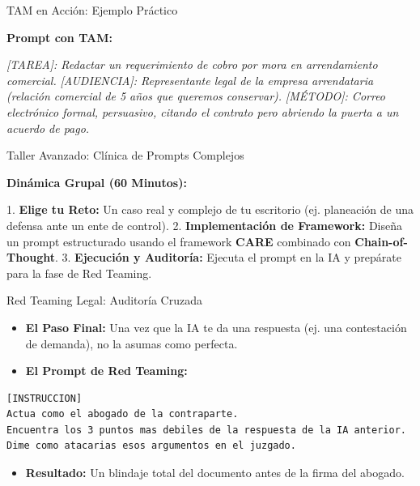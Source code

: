 \documentclass[aspectratio=169]{beamer}
\begin{document}
\begin{frame}[fragile]{TAM en Acción: Ejemplo Práctico}


\textbf{Prompt con TAM:}

\textit{[TAREA]: Redactar un requerimiento de cobro por mora en arrendamiento comercial.}
\textit{[AUDIENCIA]: Representante legal de la empresa arrendataria (relación comercial de 5 años que queremos conservar).}
\textit{[MÉTODO]: Correo electrónico formal, persuasivo, citando el contrato pero abriendo la puerta a un acuerdo de pago.}

\end{frame}



\begin{frame}[fragile]{Taller Avanzado: Clínica de Prompts Complejos}


\textbf{Dinámica Grupal (60 Minutos):}

1. \textbf{Elige tu Reto:} Un caso real y complejo de tu escritorio (ej. planeación de una defensa ante un ente de control).
2. \textbf{Implementación de Framework:} Diseña un prompt estructurado usando el framework \textbf{CARE} combinado con \textbf{Chain-of-Thought}.
3. \textbf{Ejecución y Auditoría:} Ejecuta el prompt en la IA y prepárate para la fase de Red Teaming.


\end{frame}



\begin{frame}[fragile]{Red Teaming Legal: Auditoría Cruzada}


\begin{itemize}
  \item \textbf{El Paso Final:} Una vez que la IA te da una respuesta (ej. una contestación de demanda), no la asumas como perfecta.
  \item \textbf{El Prompt de Red Teaming:}
\end{itemize}
\begin{lstlisting}[basicstyle=\ttfamily\scriptsize]
[INSTRUCCION]
Actua como el abogado de la contraparte.
Encuentra los 3 puntos mas debiles de la respuesta de la IA anterior.
Dime como atacarias esos argumentos en el juzgado.
\end{lstlisting}
\begin{itemize}
  \item \textbf{Resultado:} Un blindaje total del documento antes de la firma del abogado.
\end{itemize}
\end{frame}
\end{document}

